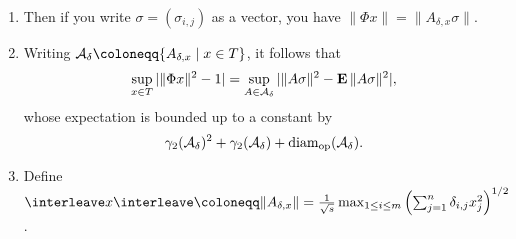\begin{enumerate}[leftmargin=*]
  \begin{enumerate}
  \item Then if you write $\sigma = (\sigma_{i,j})$ as a vector, you
    have $\|\Phi x\| = \|A_{\delta,x} \sigma\|$.
  \item Writing $\A_\delta \coloneqq \{A_{\delta,x} \mid x \in T\}$,
    it follows that
    \[
    \sup_{x \in T} | \|\Phi x\|^2 - 1 | = \sup_{A \in \mathcal{A}_\delta} |
    \|A\sigma\|^2 - \operatorname*{\mathbf{E}}\|A\sigma\|^2 |,
    \]
    whose expectation is bounded up to a constant by
    \[
    \gamma_2(\mathcal{A}_\delta)^2 + \gamma_2(\mathcal{A}_\delta) +
    \operatorname{diam}_{\mathrm{op}}(\mathcal{A}_\delta).
    \]
  \item Define $\trip x \trip \coloneqq \| A_{\delta,x} \| =
    \frac{1}{\sqrt{s}} \max_{1 \le i \le m} \left( \sum_{j=1}^n
    \delta_{i,j} x_j^2 \right)^{1/2}$.
  \end{enumerate}
\end{enumerate}







